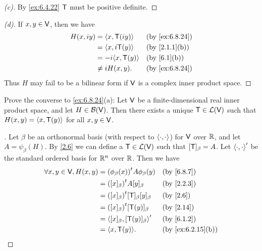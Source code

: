 \begin{proof}[(c)]
  By \cref{ex:6.4.22} \(\mathsf{T}\) must be positive definite.
\end{proof}

\begin{proof}[(d)]
  If \(x, y \in \mathsf{V}\), then we have
  \begin{align*}
    H(x, iy) & = \inn{x, \T(iy)}   &  & \by{ex:6.8.24} \\
             & = \inn{x, i \T(y)}  &  & \by{2.1.1}[b]  \\
             & = -i \inn{x, \T(y)} &  & \by{6.1}[b]    \\
             & \neq i H(x, y).     &  & \by{ex:6.8.24}
  \end{align*}
  Thus \(H\) may fail to be a bilinear form if \(\mathsf{V}\) is a complex inner product space.
\end{proof}

\begin{ex}\label{ex:6.8.25}
  Prove the converse to \cref{ex:6.8.24}(a):
  Let \(\mathsf{V}\) be a finite-dimensional real inner product space, and let \(H \in \mathcal{B}(\mathsf{V})\).
  Then there exists a unique \(\mathsf{T} \in \mathcal{L}(\mathsf{V})\) such that \(H(x, y) = \left\langle x, \mathsf{T}(y)\right\rangle\) for all \(x, y \in \mathsf{V}\).
\end{ex}

\begin{proof}[]
  Let \(\beta\) be an orthonormal basis (with respect to \(\left\langle\cdot, \cdot\right\rangle\)) for \(\mathsf{V}\) over \(\mathbb{R}\), and let \(A = \psi_{\beta}(H)\).
  By \cref{2.6} we can define a \(\mathsf{T} \in \mathcal{L}(\mathsf{V})\) such that \([\mathsf{T}]_{\beta} = A\).
  Let \(\left\langle\cdot, \cdot\right\rangle'\) be the standard ordered basis for \(\mathbb{R}^n\) over \(\mathbb{R}\).
  Then we have
  \begin{align*}
    \forall x, y \in \V, H(x, y) & = \tp{(\phi_{\beta}(x))} A \phi_{\beta}(y)    &  & \by{6.8.7}        \\
                                 & = \tp{([x]_{\beta})} A [y]_{\beta}            &  & \by{2.2.3}        \\
                                 & = \tp{([x]_{\beta})} [\T]_{\beta} [y]_{\beta} &  & \by{2.6}          \\
                                 & = \tp{([x]_{\beta})} [\T(y)]_{\beta}          &  & \by{2.14}         \\
                                 & = \inn{[x]_{\beta}, [\T(y)]_{\beta}}'         &  & \by{6.1.2}        \\
                                 & = \inn{x, \T(y)}.                             &  & \by{ex:6.2.15}[b]
  \end{align*}
\end{proof}

